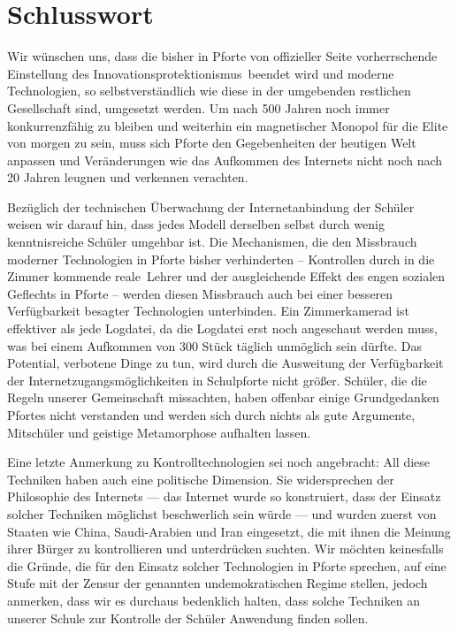 \documentclass[10pt,a4paper,notitlepage]{scrartcl}
\newcommand{\gfo}{\grqq\ }
\newcommand{\gfu}{\glqq}
\begin{document}
\section{Schlusswort}
\begin{multicols}{2}
Wir wünschen uns, dass die bisher in Pforte von offizieller Seite vorherrschende Einstellung des \gfu Innovationsprotektionismus\gfo beendet wird und moderne Technologien, so selbstverständlich wie diese in der umgebenden restlichen Gesellschaft sind, umgesetzt werden. Um nach 500 Jahren noch immer konkurrenzfähig zu bleiben und weiterhin ein magnetischer Monopol für die Elite von morgen zu sein, muss sich Pforte den Gegebenheiten der heutigen Welt anpassen und Veränderungen wie das Aufkommen des Internets nicht noch nach 20 Jahren leugnen und verkennen verachten.

Bezüglich der technischen Überwachung der Internetanbindung der Schüler weisen wir darauf hin, dass jedes Modell derselben selbst durch wenig kenntnisreiche Schüler umgehbar ist. Die Mechanismen, die den Missbrauch moderner Technologien in Pforte bisher verhinderten -- Kontrollen durch in die Zimmer kommende \gfu reale\gfo Lehrer und der ausgleichende Effekt des engen sozialen Geflechts in Pforte -- werden diesen Missbrauch auch bei einer besseren Verfügbarkeit besagter Technologien unterbinden. Ein Zimmerkamerad ist effektiver als jede Logdatei, da die Logdatei erst noch angeschaut werden muss, was bei einem Aufkommen von 300 Stück täglich unmöglich sein dürfte. Das Potential, verbotene Dinge zu tun, wird durch die Ausweitung der Verfügbarkeit der Internetzugangsmöglichkeiten in Schulpforte nicht größer. Schüler, die die Regeln unserer Gemeinschaft missachten, haben offenbar einige Grundgedanken Pfortes nicht verstanden und werden sich durch nichts als gute Argumente, Mitschüler und geistige Metamorphose aufhalten lassen.

Eine letzte Anmerkung zu Kontrolltechnologien sei noch angebracht: All diese Techniken haben auch eine politische Dimension. Sie widersprechen der Philosophie des Internets --- das Internet wurde so konstruiert, dass der Einsatz solcher Techniken möglichst beschwerlich sein würde --- und wurden zuerst von Staaten wie China, Saudi-Arabien und Iran eingesetzt, die mit ihnen die Meinung ihrer Bürger zu kontrollieren und unterdrücken suchten. Wir möchten keinesfalls die Gründe, die für den Einsatz solcher Technologien in Pforte sprechen, auf eine Stufe mit der Zensur der genannten undemokratischen Regime stellen, jedoch anmerken, dass wir es durchaus bedenklich halten, dass solche Techniken an unserer Schule zur Kontrolle der Schüler Anwendung finden sollen.
\end{multicols}
%
%
%
\end{document}
